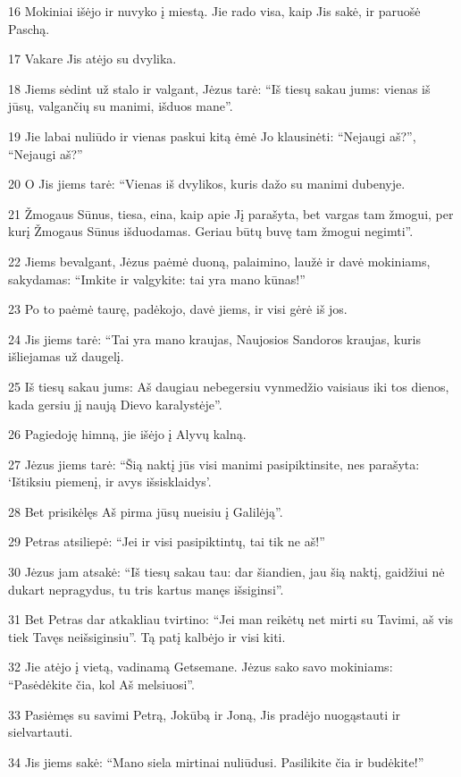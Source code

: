 \par 16 Mokiniai išėjo ir nuvyko į miestą. Jie rado visa, kaip Jis sakė, ir paruošė Paschą. 
\par 17 Vakare Jis atėjo su dvylika. 
\par 18 Jiems sėdint už stalo ir valgant, Jėzus tarė: “Iš tiesų sakau jums: vienas iš jūsų, valgančių su manimi, išduos mane”. 
\par 19 Jie labai nuliūdo ir vienas paskui kitą ėmė Jo klausinėti: “Nejaugi aš?”, “Nejaugi aš?” 
\par 20 O Jis jiems tarė: “Vienas iš dvylikos, kuris dažo su manimi dubenyje. 
\par 21 Žmogaus Sūnus, tiesa, eina, kaip apie Jį parašyta, bet vargas tam žmogui, per kurį Žmogaus Sūnus išduodamas. Geriau būtų buvę tam žmogui negimti”. 
\par 22 Jiems bevalgant, Jėzus paėmė duoną, palaimino, laužė ir davė mokiniams, sakydamas: “Imkite ir valgykite: tai yra mano kūnas!” 
\par 23 Po to paėmė taurę, padėkojo, davė jiems, ir visi gėrė iš jos. 
\par 24 Jis jiems tarė: “Tai yra mano kraujas, Naujosios Sandoros kraujas, kuris išliejamas už daugelį. 
\par 25 Iš tiesų sakau jums: Aš daugiau nebegersiu vynmedžio vaisiaus iki tos dienos, kada gersiu jį naują Dievo karalystėje”. 
\par 26 Pagiedoję himną, jie išėjo į Alyvų kalną. 
\par 27 Jėzus jiems tarė: “Šią naktį jūs visi manimi pasipiktinsite, nes parašyta: ‘Ištiksiu piemenį, ir avys išsisklaidys’. 
\par 28 Bet prisikėlęs Aš pirma jūsų nueisiu į Galilėją”. 
\par 29 Petras atsiliepė: “Jei ir visi pasipiktintų, tai tik ne aš!” 
\par 30 Jėzus jam atsakė: “Iš tiesų sakau tau: dar šiandien, jau šią naktį, gaidžiui nė dukart nepragydus, tu tris kartus manęs išsiginsi”. 
\par 31 Bet Petras dar atkakliau tvirtino: “Jei man reikėtų net mirti su Tavimi, aš vis tiek Tavęs neišsiginsiu”. Tą patį kalbėjo ir visi kiti. 
\par 32 Jie atėjo į vietą, vadinamą Getsemane. Jėzus sako savo mokiniams: “Pasėdėkite čia, kol Aš melsiuosi”. 
\par 33 Pasiėmęs su savimi Petrą, Jokūbą ir Joną, Jis pradėjo nuogąstauti ir sielvartauti. 
\par 34 Jis jiems sakė: “Mano siela mirtinai nuliūdusi. Pasilikite čia ir budėkite!” 
